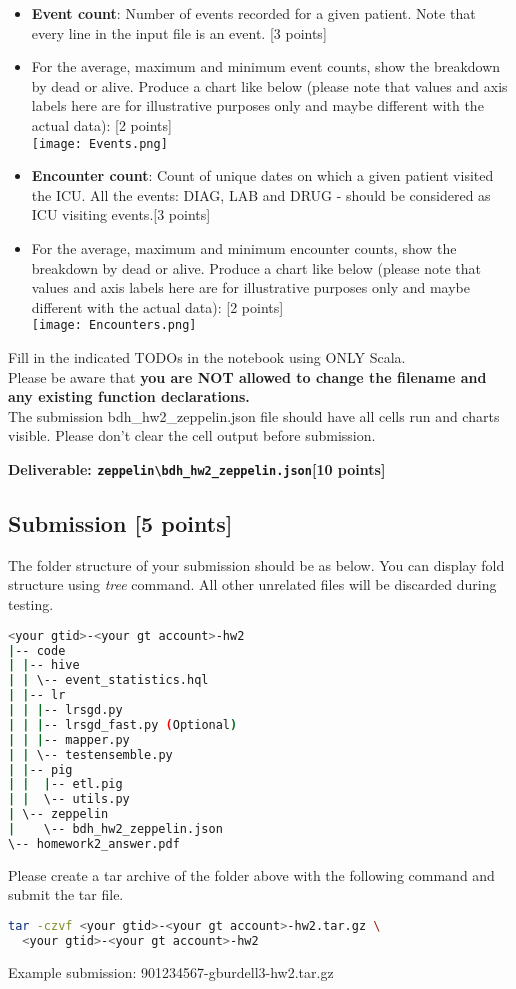 \documentclass[12pt]{article}
\begin{document}
\begin{itemize}
\item \textbf{Event count}: Number of events recorded for a given patient. Note that every line in the input file is an event. [3 points]
\item For the average, maximum and minimum event counts, show the breakdown by dead or alive. Produce a chart like below (please note that values and axis labels here are for illustrative purposes only and maybe different with the actual data): [2 points]\\
\texttt{[image: Events.png]}
\item \textbf{Encounter count}: Count of unique dates on which a given patient visited the ICU. All the events: DIAG, LAB and DRUG - should be considered as ICU visiting events.[3 points]
\item For the average, maximum and minimum encounter counts, show the breakdown by dead or alive. Produce a chart like below (please note that values and axis labels here are for illustrative purposes only and maybe different with the actual data): [2 points]\\
\texttt{[image: Encounters.png]}
\end{itemize}
Fill in the indicated TODOs in the notebook using ONLY Scala.\\

Please be aware that \textbf{\color{red} you are NOT allowed to change the filename and any existing function declarations.}\\

The submission bdh\_hw2\_zeppelin.json file should have all cells run and charts visible. Please don't clear the cell output before submission.

\textbf{Deliverable: \texttt{zeppelin\textbackslash bdh\_hw2\_zeppelin.json}[10 points]}


\subsection{Submission [5 points]}
The folder structure of your submission should be as below. You can display fold structure using \textit{tree} command. All other unrelated files will be discarded during testing.
\begin{lstlisting}[language=bash,frame=single]
<your gtid>-<your gt account>-hw2
|-- code
| |-- hive
| | \-- event_statistics.hql
| |-- lr
| | |-- lrsgd.py
| | |-- lrsgd_fast.py (Optional)
| | |-- mapper.py
| | \-- testensemble.py
| |-- pig
| |  |-- etl.pig
| |  \-- utils.py
| \-- zeppelin
|    \-- bdh_hw2_zeppelin.json
\-- homework2_answer.pdf
\end{lstlisting}

Please create a tar archive of the folder above with the following command and submit the tar file.
\begin{lstlisting}[language=bash,frame=single]
tar -czvf <your gtid>-<your gt account>-hw2.tar.gz \
  <your gtid>-<your gt account>-hw2
\end{lstlisting}
Example submission: 901234567-gburdell3-hw2.tar.gz
\end{document}
